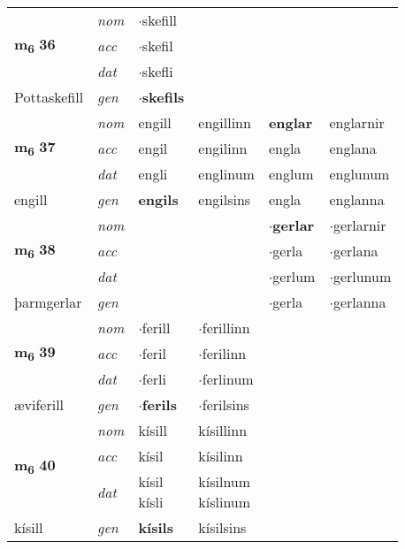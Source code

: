 \begin{longtable}[l]{llllll}
\multirow{3}{*}{{{\textbf{m{\textsubscript{6}}} \Large{\textbf{36}}}}}  & {\footnotesize{{\textit{nom}}}} & $\cdot$skefill &     & \textbf{} &   \\*
 &  {\footnotesize{{\textit{acc}}}} & $\cdot$skefil  &    &   &  \\*
 &  {\footnotesize{{\textit{dat}}}} & $\cdot$skefli &    &  &  \\*
 {\footnotesize{Pottaskefill}} &   {\footnotesize{{\textit{gen}}}} & \textbf{$\cdot$skefils}  &   &  &  \\
\cmidrule{1-6}


\multirow{3}{*}{{{\textbf{m{\textsubscript{6}}} \Large{\textbf{37}}}}}  & {\footnotesize{{\textit{nom}}}} & engill & engillinn    & \textbf{englar} & englarnir  \\*
 &  {\footnotesize{{\textit{acc}}}} & engil  & engilinn   & engla  & englana \\*
 &  {\footnotesize{{\textit{dat}}}} & engli & englinum   & englum & englunum \\*
 {\footnotesize{engill}} &   {\footnotesize{{\textit{gen}}}} & \textbf{engils}  & engilsins  & engla & englanna \\
\cmidrule{1-6}


\multirow{3}{*}{{{\textbf{m{\textsubscript{6}}} \Large{\textbf{38}}}}}  & {\footnotesize{{\textit{nom}}}} &  &     & \textbf{$\cdot$gerlar} & $\cdot$gerlarnir  \\*
 &  {\footnotesize{{\textit{acc}}}} &   &    & $\cdot$gerla  & $\cdot$gerlana \\*
 &  {\footnotesize{{\textit{dat}}}} &  &    & $\cdot$gerlum & $\cdot$gerlunum \\*
 {\footnotesize{þarmgerlar}} &   {\footnotesize{{\textit{gen}}}} & \textbf{}  &   & $\cdot$gerla & $\cdot$gerlanna \\
\cmidrule{1-6}


\multirow{3}{*}{{{\textbf{m{\textsubscript{6}}} \Large{\textbf{39}}}}}  & {\footnotesize{{\textit{nom}}}} & $\cdot$ferill & $\cdot$ferillinn    & \textbf{} &   \\*
 &  {\footnotesize{{\textit{acc}}}} & $\cdot$feril  & $\cdot$ferilinn   &   &  \\*
 &  {\footnotesize{{\textit{dat}}}} & $\cdot$ferli & $\cdot$ferlinum   &  &  \\*
 {\footnotesize{æviferill}} &   {\footnotesize{{\textit{gen}}}} & \textbf{$\cdot$ferils}  & $\cdot$ferilsins  &  &  \\
\cmidrule{1-6}


\multirow{3}{*}{{{\textbf{m{\textsubscript{6}}} \Large{\textbf{40}}}}}  & {\footnotesize{{\textit{nom}}}} & kísill & kísillinn    & \textbf{} &   \\*
 &  {\footnotesize{{\textit{acc}}}} & kísil  & kísilinn   &   &  \\*
 &  {\footnotesize{{\textit{dat}}}} & \specialcell{kísil\\ kísli} & \specialcell{kísilnum\\ kíslinum}   &  &  \\*
 {\footnotesize{kísill}} &   {\footnotesize{{\textit{gen}}}} & \textbf{kísils}  & kísilsins  &  &  \\
\cmidrule{1-6}



\end{longtable}
